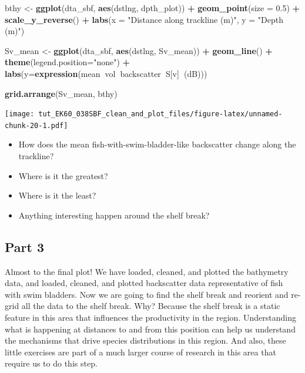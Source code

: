 \documentclass[]{article}
\newenvironment{Shaded}{\begin{snugshade}}{\end{snugshade}}
\newcommand{\DataTypeTok}[1]{\textcolor[rgb]{0.13,0.29,0.53}{#1}}
\newcommand{\FloatTok}[1]{\textcolor[rgb]{0.00,0.00,0.81}{#1}}
\newcommand{\KeywordTok}[1]{\textcolor[rgb]{0.13,0.29,0.53}{\textbf{#1}}}
\newcommand{\NormalTok}[1]{#1}
\newcommand{\OperatorTok}[1]{\textcolor[rgb]{0.81,0.36,0.00}{\textbf{#1}}}
\newcommand{\StringTok}[1]{\textcolor[rgb]{0.31,0.60,0.02}{#1}}
\providecommand{\tightlist}{%
  \setlength{\itemsep}{0pt}\setlength{\parskip}{0pt}}
\begin{document}
\begin{Shaded}
\begin{Highlighting}[]
\NormalTok{bthy <-}\StringTok{ }\KeywordTok{ggplot}\NormalTok{(dta_sbf, }\KeywordTok{aes}\NormalTok{(dstlng, dpth_plot)) }\OperatorTok{+}
\StringTok{  }\KeywordTok{geom_point}\NormalTok{(}\DataTypeTok{size =} \FloatTok{0.5}\NormalTok{) }\OperatorTok{+}
\StringTok{  }\KeywordTok{scale_y_reverse}\NormalTok{() }\OperatorTok{+}
\StringTok{  }\KeywordTok{labs}\NormalTok{(}\DataTypeTok{x =} \StringTok{"Distance along trackline (m)"}\NormalTok{, }\DataTypeTok{y =} \StringTok{"Depth (m)"}\NormalTok{)}

\NormalTok{Sv_mean <-}\StringTok{ }\KeywordTok{ggplot}\NormalTok{(dta_sbf, }\KeywordTok{aes}\NormalTok{(dstlng, Sv_mean)) }\OperatorTok{+}
\StringTok{  }\KeywordTok{geom_line}\NormalTok{() }\OperatorTok{+}
\StringTok{  }\KeywordTok{theme}\NormalTok{(}\DataTypeTok{legend.position=}\StringTok{"none"}\NormalTok{) }\OperatorTok{+}
\StringTok{  }\KeywordTok{labs}\NormalTok{(}\DataTypeTok{y=}\KeywordTok{expression}\NormalTok{(mean}\OperatorTok{~}\NormalTok{vol}\OperatorTok{~}\NormalTok{backscatter}\OperatorTok{~}\NormalTok{S[v]}\OperatorTok{~}\NormalTok{(dB)))   }

\KeywordTok{grid.arrange}\NormalTok{(Sv_mean, bthy)}
\end{Highlighting}
\end{Shaded}

\texttt{[image: tut\_EK60\_038SBF\_clean\_and\_plot\_files/figure-latex/unnamed-chunk-20-1.pdf]}

\begin{itemize}
\tightlist
\item
  How does the mean fish-with-swim-bladder-like backscatter change along
  the trackline?\\
\item
  Where is it the greatest?\\
\item
  Where is it the least?\\
\item
  Anything interesting happen around the shelf break?
\end{itemize}

\hypertarget{part-3}{%
\subsection{Part 3}\label{part-3}}

Almost to the final plot! We have loaded, cleaned, and plotted the
bathymetry data, and loaded, cleaned, and plotted backscatter data
representative of fish with swim bladders. Now we are going to find the
shelf break and reorient and re-grid all the data to the shelf break.
Why? Because the shelf break is a static feature in this area that
influences the productivity in the region. Understanding what is
happening at distances to and from this position can help us understand
the mechanisms that drive species distributions in this region. And
also, these little exercises are part of a much larger course of
research in this area that require us to do this step.
\end{document}
